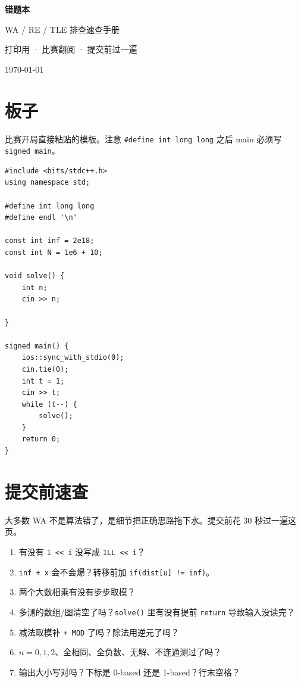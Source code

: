 \documentclass[UTF8,openany,oneside,zihao=-4]{ctexbook}
\begin{document}
\begin{titlepage}
\centering
\vspace*{3cm}
{\Huge\bfseries 错题本\par}
\vspace{0.6cm}
{\Large WA / RE / TLE 排查速查手册\par}
\vspace{1.5cm}
{\normalsize 打印用 · 比赛翻阅 · 提交前过一遍\par}
\vfill
{\large \today\par}
\end{titlepage}

\tableofcontents
\clearpage

\chapter{板子}

比赛开局直接粘贴的模板。注意 \texttt{\#define int long long} 之后 main 必须写 \texttt{signed main}。

\begin{lstlisting}
#include <bits/stdc++.h>
using namespace std;

#define int long long
#define endl '\n'

const int inf = 2e18;
const int N = 1e6 + 10;

void solve() {
    int n;
    cin >> n;

}

signed main() {
    ios::sync_with_stdio(0);
    cin.tie(0);
    int t = 1;
    cin >> t;
    while (t--) {
        solve();
    }
    return 0;
}
\end{lstlisting}

\chapter{提交前速查}

\begin{note}
大多数 WA 不是算法错了，是细节把正确思路拖下水。提交前花 30 秒过一遍这页。
\end{note}

\begin{enumerate}
  \item 有没有 \lstinline|1 << i| 没写成 \lstinline|1LL << i|？
  \item \lstinline|inf + x| 会不会爆？转移前加 \lstinline|if(dist[u] != inf)|。
  \item 两个大数相乘有没有步步取模？
  \item 多测的数组/图清空了吗？\lstinline|solve()| 里有没有提前 \lstinline|return| 导致输入没读完？
  \item 减法取模补 \lstinline|+ MOD| 了吗？除法用逆元了吗？
  \item $n=0,1,2$、全相同、全负数、无解、不连通测过了吗？
  \item 输出大小写对吗？下标是 0-based 还是 1-based？行末空格？
\end{enumerate}
\end{document}

